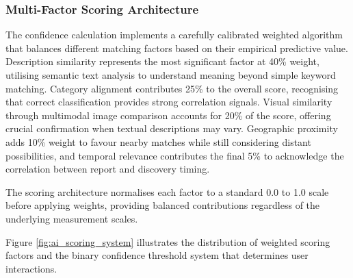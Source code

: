 \subsubsection{Multi-Factor Scoring Architecture}

The confidence calculation implements a carefully calibrated weighted algorithm that balances different matching factors based on their empirical predictive value. Description similarity represents the most significant factor at 40\% weight, utilising semantic text analysis to understand meaning beyond simple keyword matching. Category alignment contributes 25\% to the overall score, recognising that correct classification provides strong correlation signals. Visual similarity through multimodal image comparison accounts for 20\% of the score, offering crucial confirmation when textual descriptions may vary. Geographic proximity adds 10\% weight to favour nearby matches while still considering distant possibilities, and temporal relevance contributes the final 5\% to acknowledge the correlation between report and discovery timing.

The scoring architecture normalises each factor to a standard 0.0 to 1.0 scale before applying weights, providing balanced contributions regardless of the underlying measurement scales.

Figure \ref{fig:ai_scoring_system} illustrates the distribution of weighted scoring factors and the binary confidence threshold system that determines user interactions.

